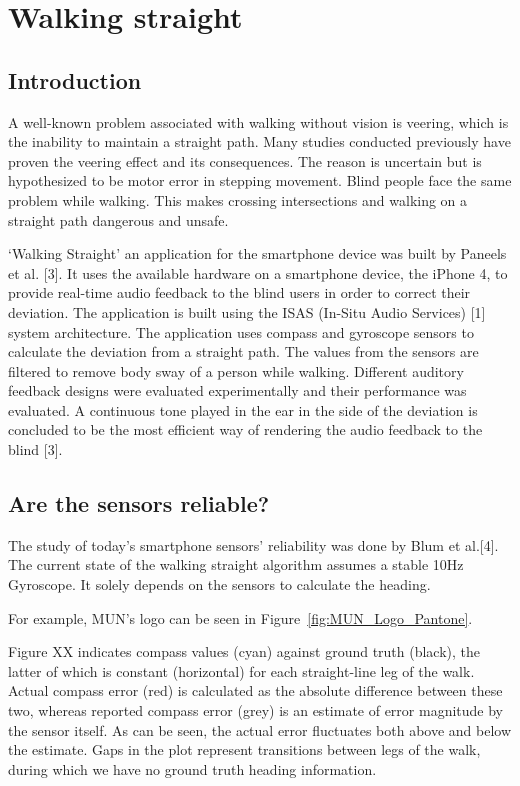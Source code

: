 \chapter{Walking straight}
\label{chap:intro}

\section{Introduction}

\label{sec:xrefs}

A well-known problem associated with walking without vision is veering, which is the inability to maintain a straight path. Many studies conducted previously have proven the veering effect and its consequences. The reason is uncertain but is hypothesized to be motor error in stepping movement.  Blind people face the same problem while walking. This makes crossing intersections and walking on a straight path dangerous and unsafe.

‘Walking Straight’ an application for the smartphone device was built by Paneels et al. [3]. It uses the available hardware on a smartphone device, the iPhone 4, to provide real-time audio feedback to the blind users in order to correct their deviation. The application is built using the ISAS (In-Situ Audio Services) [1] system architecture. The application uses compass and gyroscope sensors to calculate the deviation from a straight path. The values from the sensors are filtered to remove body sway of a person while walking. Different auditory feedback designs were evaluated experimentally and their performance was evaluated. A continuous tone played in the ear in the side of the deviation is concluded to be the most efficient way of rendering the audio feedback to the blind [3].

\section{Are the sensors reliable?}

The study of today’s smartphone sensors’ reliability was done by Blum et al.[4]. The current state of the walking straight algorithm assumes a stable 10Hz Gyroscope. It solely depends on the sensors to calculate the heading.  

For example, MUN's logo can be seen in Figure~\ref{fig:MUN_Logo_Pantone}.

Figure XX indicates compass values (cyan) against ground truth (black), the latter of which is constant (horizontal) for each straight-line leg of the walk. Actual compass error (red) is calculated as the absolute difference between these two, whereas reported compass error (grey) is an estimate of error magnitude by the sensor itself. As can be seen, the actual error fluctuates both above and below the estimate. Gaps in the plot represent transitions between legs of the walk, during which we have no ground truth heading information.

